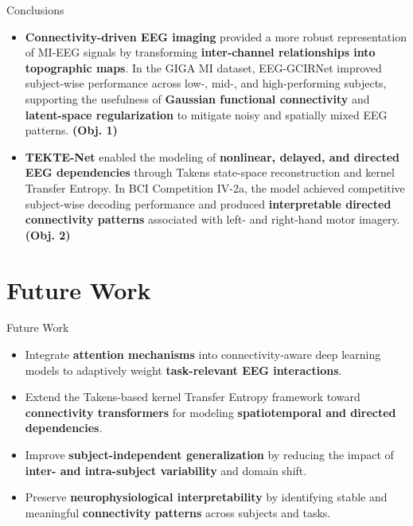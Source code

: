\documentclass[aspectratio=169]{beamer}
\begin{document}
\begin{frame}{Conclusions}

\begin{itemize}

\item \textbf{Connectivity-driven EEG imaging} provided a more robust representation of MI-EEG signals by transforming \textbf{inter-channel relationships into topographic maps}. In the GIGA MI dataset, EEG-GCIRNet improved subject-wise performance across low-, mid-, and high-performing subjects, supporting the usefulness of \textbf{Gaussian functional connectivity} and \textbf{latent-space regularization} to mitigate noisy and spatially mixed EEG patterns. \textbf{(Obj. 1)}

\vspace{0.25cm}

\item \textbf{TEKTE-Net} enabled the modeling of \textbf{nonlinear, delayed, and directed EEG dependencies} through Takens state-space reconstruction and kernel Transfer Entropy. In BCI Competition IV-2a, the model achieved competitive subject-wise decoding performance and produced \textbf{interpretable directed connectivity patterns} associated with left- and right-hand motor imagery. \textbf{(Obj. 2)}

\end{itemize}
\end{frame}
\section{Future Work}
\begin{frame}{Future Work}

\begin{itemize}

\item Integrate \textbf{attention mechanisms} into connectivity-aware deep learning models to adaptively weight \textbf{task-relevant EEG interactions}.

\item Extend the Takens-based kernel Transfer Entropy framework toward \textbf{connectivity transformers} for modeling \textbf{spatiotemporal and directed dependencies}.

\item Improve \textbf{subject-independent generalization} by reducing the impact of \textbf{inter- and intra-subject variability} and domain shift.

\item Preserve \textbf{neurophysiological interpretability} by identifying stable and meaningful \textbf{connectivity patterns} across subjects and tasks.

\end{itemize}

\end{frame}
\end{document}
